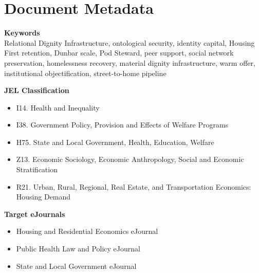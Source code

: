 \documentclass[12pt, letterpaper]{article}
\begin{document}
\begin{titlepage}
\begin{minipage}{0.95\textwidth}
\end{minipage}
\end{titlepage}


\newpage
\section*{Document Metadata}

{\footnotesize{}

\noindent\textbf{Keywords}\\[1pt]
Relational Dignity Infrastructure, ontological security, identity capital, Housing First retention, Dunbar scale, Pod Steward, peer support, social network preservation, homelessness recovery, material dignity infrastructure, warm offer, institutional objectification, street-to-home pipeline

\vspace{8pt}
\noindent\textbf{JEL Classification}
\begin{itemize}[nosep, before={\vspace{-8pt}}, leftmargin=2em]
    \item I14. Health and Inequality
    \item I38. Government Policy, Provision and Effects of Welfare Programs
    \item H75. State and Local Government, Health, Education, Welfare
    \item Z13. Economic Sociology, Economic Anthropology, Social and Economic Stratification
    \item R21. Urban, Rural, Regional, Real Estate, and Transportation Economics: Housing Demand
\end{itemize}

\vspace{8pt}
\noindent\textbf{Target eJournals}
\begin{itemize}[nosep, before={\vspace{-8pt}}, leftmargin=2em]
    \item Housing and Residential Economics eJournal
    \item Public Health Law and Policy eJournal
    \item State and Local Government eJournal
\end{itemize}

}
\end{document}
